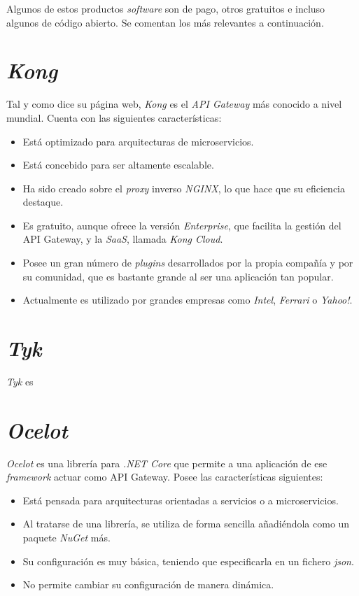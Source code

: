 \documentclass[11pt,spanish,listoffigures]{tfgetsinf}
\begin{document}
Algunos de estos productos \emph{software} son de pago, otros gratuitos e incluso algunos de código abierto. Se comentan los más relevantes a continuación.

\section{\emph{Kong}}
Tal y como dice su página web, \emph{Kong} \cite{Kong} es el \emph{API Gateway} más conocido a nivel mundial. Cuenta con las siguientes características:

\begin{itemize}

	\item Está optimizado para arquitecturas de microservicios.
	\item Está concebido para ser altamente escalable.
	\item Ha sido creado sobre el \emph{proxy} inverso \emph{NGINX}, lo que hace que su eficiencia destaque.
	\item Es gratuito, aunque ofrece la versión \emph{Enterprise}, que facilita la gestión del API Gateway, y la \emph{SaaS}, llamada \emph{Kong Cloud}.
	\item Posee un gran número de \emph{plugins} desarrollados por la propia compañía y por su comunidad, que es bastante grande al ser una aplicación tan popular.
	\item Actualmente es utilizado por grandes empresas como \emph{Intel}, \emph{Ferrari} o \emph{Yahoo!}.

\end{itemize}

\section{\emph{Tyk}}
\emph{Tyk} \cite{Tyk} es

\section{\emph{Ocelot}}
\emph{Ocelot} \cite{Ocelot} es una librería para \emph{.NET Core} que permite a una aplicación de ese \emph{framework} actuar como API Gateway. Posee las características siguientes:

\begin{itemize}

	\item Está pensada para arquitecturas orientadas a servicios o a microservicios.
	\item Al tratarse de una librería, se utiliza de forma sencilla añadiéndola como un paquete \emph{NuGet} más.
	\item Su configuración es muy básica, teniendo que especificarla en un fichero \emph{json}.
	\item No permite cambiar su configuración de manera dinámica.

\end{itemize}
\end{document}

